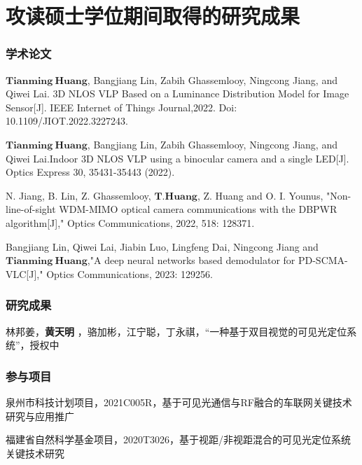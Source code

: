 \chapter{攻读硕士学位期间取得的研究成果} %

\subsection*{学术论文}
\begin{enumerate}[topsep = 0 pt, itemsep= 0 pt, parsep=0pt, partopsep=0pt, leftmargin=44pt, itemindent=0pt, labelsep=6pt, label={[\arabic*]}]           
    \item $\mathbf{Tianming \ Huang}$, Bangjiang Lin, Zabih Ghassemlooy, Ningcong Jiang, and Qiwei Lai. 3D NLOS VLP Based on a Luminance Distribution Model for Image Sensor[J]. IEEE Internet of Things Journal,2022. Doi: 10.1109/JIOT.2022.3227243.
    \item $\mathbf{Tianming \ Huang}$, Bangjiang Lin, Zabih Ghassemlooy, Ningcong Jiang, and Qiwei Lai.Indoor 3D NLOS VLP using a binocular camera and a single LED[J]. Optics Express 30, 35431-35443 (2022).
    \item N. Jiang, B. Lin, Z. Ghassemlooy, $\mathbf{T. Huang}$, Z. Huang and O. I. Younus, "Non-line-of-sight WDM-MIMO optical camera communications with the DBPWR algorithm[J]," Optics Communications, 2022, 518: 128371.
    \item Bangjiang Lin, Qiwei Lai, Jiabin Luo, Lingfeng Dai, Ningcong Jiang and $\mathbf{Tianming \ Huang}$,"A deep neural networks based demodulator for PD-SCMA-VLC[J]," Optics Communications, 2023: 129256.
	
\end{enumerate}





\subsection*{研究成果}


\begin{enumerate}[topsep = 0 pt, itemsep= 0 pt, parsep=0pt, partopsep=0pt, leftmargin=44pt, itemindent=0pt, labelsep=6pt, label={[\arabic*]}]            
    \item 林邦姜，\textbf{黄天明} ，骆加彬，江宁聪，丁永祺，“一种基于双目视觉的可见光定位系统”，授权中	
\end{enumerate}



\subsection*{参与项目}


\begin{enumerate}[topsep = 0 pt, itemsep= 0 pt, parsep=0pt, partopsep=0pt, leftmargin=44pt, itemindent=0pt, labelsep=6pt, label={[\arabic*]}]            
    \item 泉州市科技计划项目，2021C005R，基于可见光通信与RF融合的车联网关键技术研究与应用推广
    \item 福建省自然科学基金项目，2020T3026，基于视距/非视距混合的可见光定位系统关键技术研究
\end{enumerate}